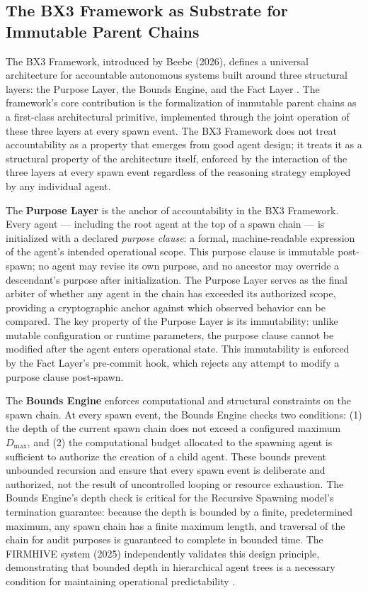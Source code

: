 \subsection{The BX3 Framework as Substrate for Immutable Parent Chains}
\label{sec:bx3}

The BX3 Framework, introduced by Beebe (2026), defines a universal architecture for accountable autonomous systems built around three structural layers: the Purpose Layer, the Bounds Engine, and the Fact Layer \cite{bx3framework2026}. The framework's core contribution is the formalization of immutable parent chains as a first-class architectural primitive, implemented through the joint operation of these three layers at every spawn event. The BX3 Framework does not treat accountability as a property that emerges from good agent design; it treats it as a structural property of the architecture itself, enforced by the interaction of the three layers at every spawn event regardless of the reasoning strategy employed by any individual agent.

The \textbf{Purpose Layer} is the anchor of accountability in the BX3 Framework. Every agent — including the root agent at the top of a spawn chain — is initialized with a declared \textit{purpose clause}: a formal, machine-readable expression of the agent's intended operational scope. This purpose clause is immutable post-spawn; no agent may revise its own purpose, and no ancestor may override a descendant's purpose after initialization. The Purpose Layer serves as the final arbiter of whether any agent in the chain has exceeded its authorized scope, providing a cryptographic anchor against which observed behavior can be compared. The key property of the Purpose Layer is its immutability: unlike mutable configuration or runtime parameters, the purpose clause cannot be modified after the agent enters operational state. This immutability is enforced by the Fact Layer's pre-commit hook, which rejects any attempt to modify a purpose clause post-spawn.

The \textbf{Bounds Engine} enforces computational and structural constraints on the spawn chain. At every spawn event, the Bounds Engine checks two conditions: (1) the depth of the current spawn chain does not exceed a configured maximum $D_{\max}$, and (2) the computational budget allocated to the spawning agent is sufficient to authorize the creation of a child agent. These bounds prevent unbounded recursion and ensure that every spawn event is deliberate and authorized, not the result of uncontrolled looping or resource exhaustion. The Bounds Engine's depth check is critical for the Recursive Spawning model's termination guarantee: because the depth is bounded by a finite, predetermined maximum, any spawn chain has a finite maximum length, and traversal of the chain for audit purposes is guaranteed to complete in bounded time. The FIRMHIVE system (2025) independently validates this design principle, demonstrating that bounded depth in hierarchical agent trees is a necessary condition for maintaining operational predictability \cite{firmhive2025}.

